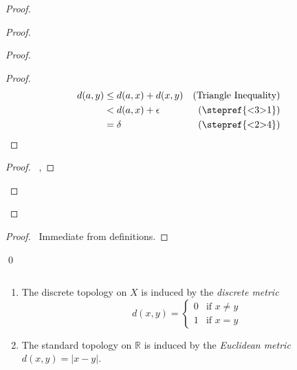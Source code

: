 \begin{proof}
  \pf
  \begin{proof}
    \begin{proof}
      \begin{proof}
        \pf
        \begin{align*}
          d(a, y) & \leq d(a, x) + d(x, y) & (\text{Triangle Inequality})\\
          & < d(a, x) + \epsilon & (\text{\stepref{<3>1}})\\
          & = \delta & (\text{\stepref{<2>4}})
        \end{align*}
      \end{proof}
      \begin{proof}
        \pf\ , 
      \end{proof}
    \end{proof}
  \end{proof}
  \begin{proof}
    \pf\ Immediate from definitions.
  \end{proof}
  \qed
\end{proof}

\begin{ex}$ $
  \begin{enumerate}
    \item
    The discrete topology on $X$ is induced by the \emph{discrete metric}
    \[ d(x,y) = \begin{cases}
    0 & \text{if } x \neq y \\
    1 & \text{if } x = y
  \end{cases} \]
  \item
  The standard topology on $\mathbb{R}$ is induced by the \emph{Euclidean metric} $d(x, y) = |x-y|$.
\end{enumerate}
\end{ex}

